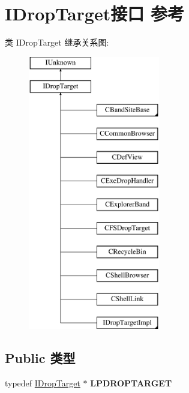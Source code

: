 \hypertarget{interface_i_drop_target}{}\section{I\+Drop\+Target接口 参考}
\label{interface_i_drop_target}
类 I\+Drop\+Target 继承关系图\+:\begin{figure}[H]
\begin{center}
\leavevmode
\includegraphics[height=12.000000cm]{interface_i_drop_target}
\end{center}
\end{figure}
\subsection*{Public 类型}
\begin{DoxyCompactItemize}
\item 
\mbox{\label{interface_i_drop_target_a65e5ea1b422e4edff5738296a192e161}} 
typedef \hyperlink{interface_i_drop_target}{I\+Drop\+Target} $\ast$ {\bfseries L\+P\+D\+R\+O\+P\+T\+A\+R\+G\+ET}
\end{DoxyCompactItemize}
